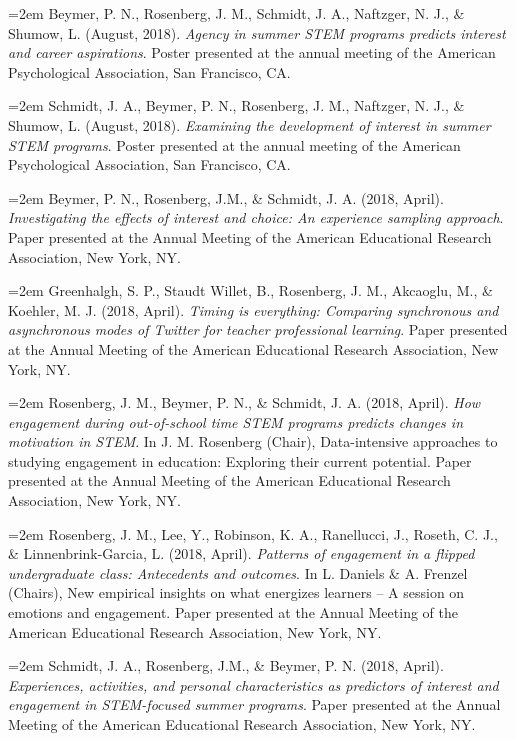 \documentclass[
  14,
]{article}
\begin{document}
\hangindent=2em Beymer, P. N., Rosenberg, J. M., Schmidt, J. A.,
Naftzger, N. J., \& Shumow, L. (August, 2018). \emph{Agency in summer
STEM programs predicts interest and career aspirations}. Poster
presented at the annual meeting of the American Psychological
Association, San Francisco, CA.

\hangindent=2em Schmidt, J. A., Beymer, P. N., Rosenberg, J. M.,
Naftzger, N. J., \& Shumow, L. (August, 2018). \emph{Examining the
development of interest in summer STEM programs}. Poster presented at
the annual meeting of the American Psychological Association, San
Francisco, CA.

\hangindent=2em Beymer, P. N., Rosenberg, J.M., \& Schmidt, J. A. (2018,
April). \emph{Investigating the effects of interest and choice: An
experience sampling approach}. Paper presented at the Annual Meeting of
the American Educational Research Association, New York, NY.

\hangindent=2em Greenhalgh, S. P., Staudt Willet, B., Rosenberg, J. M.,
Akcaoglu, M., \& Koehler, M. J. (2018, April). \emph{Timing is
everything: Comparing synchronous and asynchronous modes of Twitter for
teacher professional learning}. Paper presented at the Annual Meeting of
the American Educational Research Association, New York, NY.

\hangindent=2em Rosenberg, J. M., Beymer, P. N., \& Schmidt, J. A.
(2018, April). \emph{How engagement during out-of-school time STEM
programs predicts changes in motivation in STEM}. In J. M. Rosenberg
(Chair), Data-intensive approaches to studying engagement in education:
Exploring their current potential. Paper presented at the Annual Meeting
of the American Educational Research Association, New York, NY.

\hangindent=2em Rosenberg, J. M., Lee, Y., Robinson, K. A., Ranellucci,
J., Roseth, C. J., \& Linnenbrink-Garcia, L. (2018, April).
\emph{Patterns of engagement in a flipped undergraduate class:
Antecedents and outcomes}. In L. Daniels \& A. Frenzel (Chairs), New
empirical insights on what energizes learners -- A session on emotions
and engagement. Paper presented at the Annual Meeting of the American
Educational Research Association, New York, NY.

\hangindent=2em Schmidt, J. A., Rosenberg, J.M., \& Beymer, P. N. (2018,
April). \emph{Experiences, activities, and personal characteristics as
predictors of interest and engagement in STEM-focused summer programs}.
Paper presented at the Annual Meeting of the American Educational
Research Association, New York, NY.
\end{document}
